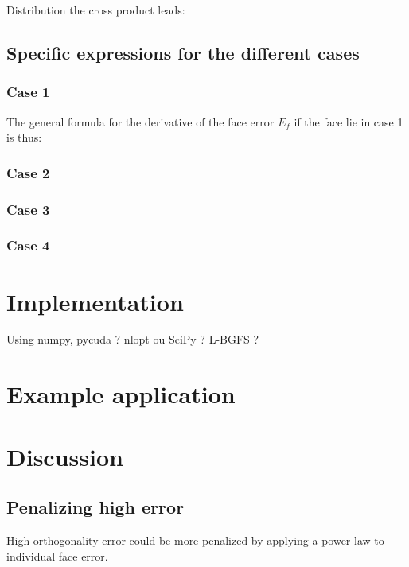 \documentclass[11pt]{article}
\begin{document}
 Distribution the cross product leads:

\subsection{Specific expressions for the different cases}

\subsubsection{Case 1}

The general formula for the derivative of the face error $E_f$ if the face lie in case 1 is thus:


\subsubsection{Case 2}


\subsubsection{Case 3}

\subsubsection{Case 4}







\section{Implementation}

Using numpy, pycuda ? nlopt ou SciPy ? L-BGFS ?


\section{Example application}



\section{Discussion}

\subsection{Penalizing high error}
High orthogonality error could be more penalized by applying a power-law to individual face error. 
\end{document}
